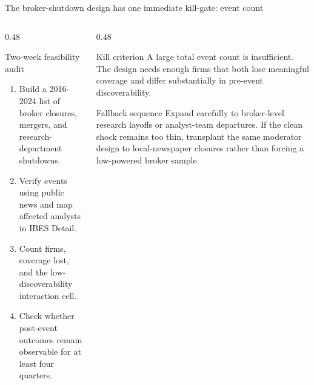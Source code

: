 \documentclass[aspectratio=169,10pt]{beamer}
\newcommand{\tightitems}{\setlength\itemsep{0.11cm}\setlength\parskip{0pt}}
\begin{document}
\begin{frame}[t]{The broker-shutdown design has one immediate kill-gate: event count}
\begin{columns}[T,onlytextwidth]
  \begin{column}{0.48\textwidth}
    \begin{block}{Two-week feasibility audit}
    \small
    \begin{enumerate}\tightitems
      \item Build a 2016-2024 list of broker closures, mergers, and research-department shutdowns.
      \item Verify events using public news and map affected analysts in IBES Detail.
      \item Count firms, coverage lost, and the low-discoverability interaction cell.
      \item Check whether post-event outcomes remain observable for at least four quarters.
    \end{enumerate}
    \end{block}
  \end{column}
  \begin{column}{0.48\textwidth}
    \begin{alertblock}{Kill criterion}
      \small A large total event count is insufficient. The design needs enough firms that both lose meaningful coverage and differ substantially in pre-event discoverability.
    \end{alertblock}
    \begin{exampleblock}{Fallback sequence}
      \small Expand carefully to broker-level research layoffs or analyst-team departures. If the clean shock remains too thin, transplant the same moderator design to local-newspaper closures rather than forcing a low-powered broker sample.
    \end{exampleblock}
  \end{column}
\end{columns}
\end{frame}
\end{document}
